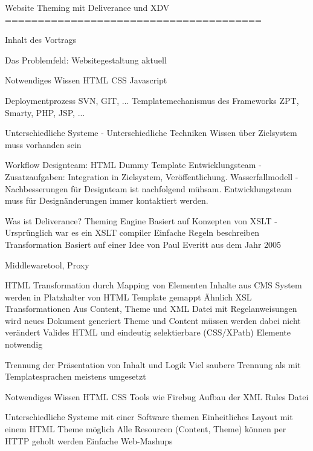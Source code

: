 Website Theming mit Deliverance und XDV
=======================================


Inhalt des Vortrags

Das Problemfeld: Websitegestaltung aktuell

    Notwendiges Wissen
        HTML
        CSS
        Javascript

        Deploymentprozess
            SVN, GIT, ...
        Templatemechanismus des Frameworks
            ZPT, Smarty, PHP, JSP, ...

        Unterschiedliche Systeme - Unterschiedliche Techniken
        Wissen über Zielsystem muss vorhanden sein

    Workflow
        Designteam: HTML Dummy Template
        Entwicklungsteam - Zusatzaufgaben: Integration in Zielsystem, Veröffentlichung.
        Wasserfallmodell - Nachbesserungen für Designteam ist nachfolgend mühsam. Entwicklungsteam muss für Designänderungen immer kontaktiert werden.



Was ist Deliverance?
    Theming Engine
        Basiert auf Konzepten von XSLT - Ursprünglich war es ein XSLT compiler
        Einfache Regeln beschreiben Transformation
        Basiert auf einer Idee von Paul Everitt aus dem Jahr 2005

    Middlewaretool, Proxy %

    HTML Transformation durch Mapping von Elementen %
        Inhalte aus CMS System werden in Platzhalter von HTML Template gemappt
        Ähnlich XSL Transformationen
        Aus Content, Theme und XML Datei mit Regelanweisungen wird neues Dokument generiert
        Theme und Content müssen werden dabei nicht verändert
        Valides HTML und eindeutig selektierbare (CSS/XPath) Elemente notwendig

    Trennung der Präsentation von Inhalt und Logik
        Viel saubere Trennung als mit Templatesprachen meistens umgesetzt

    Notwendiges Wissen
        HTML
        CSS
        Tools wie Firebug
        Aufbau der XML Rules Datei

    Unterschiedliche Systeme mit einer Software themen
        Einheitliches Layout mit einem HTML Theme möglich
        Alle Resourcen (Content, Theme) können per HTTP geholt werden
        Einfache Web-Mashups

